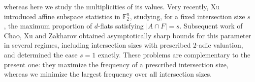 \documentclass[10pt]{article}
\theoremstyle{definition}
\begin{document}
	whereas here we study the multiplicities of its values.
	Very recently, Xu \cite{Xu26} introduced affine subspace statistics in
	\(\mathbb F_2^n\), studying, for a fixed intersection size \(s\), the
	maximum proportion of \(d\)-flats satisfying \(|A\cap F|=s\).
	Subsequent work of Chao, Xu and Zakharov \cite{CXZ26} obtained
	asymptotically sharp bounds for this parameter in several regimes,
	including intersection sizes with prescribed \(2\)-adic valuation, and
	determined the case \(s=1\) exactly.  These problems are complementary
	to the present one: they maximize the frequency of a prescribed
	intersection size, whereas we minimize the largest frequency over all
	intersection sizes.
	
	
	
	
	
	
\end{document}
